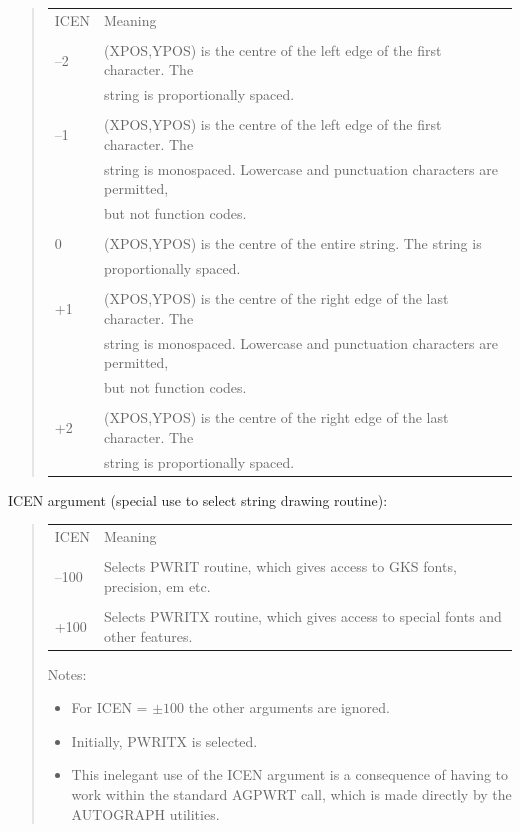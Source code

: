 \documentclass[twoside,11pt]{article}
\renewcommand{\_}{\texttt{\symbol{95}}}
\begin{document}
\begin{quote}
\begin{tabular}{ll}
ICEN & Meaning\\
\\
--2 & (XPOS,YPOS) is the centre of the left edge of the first character.  The\\
 & string is proportionally spaced.\\
\\
--1 & (XPOS,YPOS) is the centre of the left edge of the first character.  The\\
 & string is monospaced.  Lowercase and punctuation characters are permitted,\\
 & but not function codes.\\
\\
0 & (XPOS,YPOS) is the centre of the entire string.  The string is\\
 & proportionally spaced.\\
\\
+1 & (XPOS,YPOS) is the centre of the right edge of the last character.  The\\
 & string is monospaced.  Lowercase and punctuation characters are permitted,\\
 & but not function codes.\\
\\
+2 & (XPOS,YPOS) is the centre of the right edge of the last character.  The\\
 & string is proportionally spaced.\\
\end{tabular}
\end{quote}

ICEN argument (special use to select string drawing routine):

\begin{quote}
\begin{tabular}{ll}
ICEN & Meaning\\
\\
--100 & Selects PWRIT routine, which gives access to GKS fonts, precision, 
{em etc.}\\
\\
+100 & Selects PWRITX routine, which gives access to special fonts and other
features.
\end{tabular}

Notes:

\begin{itemize}
\item For ICEN = $\pm100$ the other arguments are ignored.
\item Initially, PWRITX is selected.
\item This inelegant use of the ICEN argument is a consequence
of having to work within the standard AGPWRT call, which
is made directly by the AUTOGRAPH utilities.
\end{itemize}
\end{quote}
\end{document}
